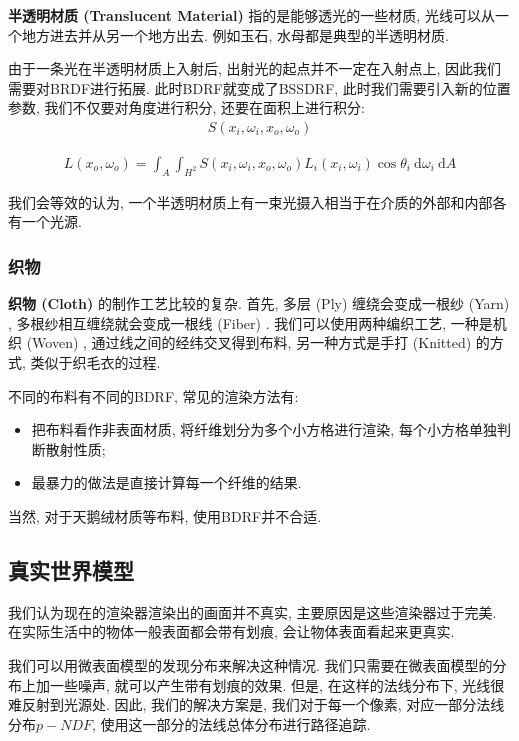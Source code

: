 \documentclass[openany]{progbookcn}
\begin{document}
\textbf{半透明材质 (Translucent Material) }指的是能够透光的一些材质, 光线可以从一个地方进去并从另一个地方出去. 例如玉石, 水母都是典型的半透明材质. 

由于一条光在半透明材质上入射后, 出射光的起点并不一定在入射点上, 因此我们需要对BRDF进行拓展. 此时BDRF就变成了BSSDRF, 此时我们需要引入新的位置参数, 我们不仅要对角度进行积分, 还要在面积上进行积分: 
\begin{eqnarray}
	S(x_i,\omega_i,x_o,\omega_o)
\end{eqnarray}

\begin{eqnarray}
	L\left(x_{o}, \omega_{o}\right)=\int_{A} \int_{H^{2}} S\left(x_{i}, \omega_{i}, x_{o}, \omega_{o}\right) L_{i}\left(x_{i}, \omega_{i}\right) \cos \theta_{i} \mathrm{~d} \omega_{i} \mathrm{~d} A
\end{eqnarray}

我们会等效的认为, 一个半透明材质上有一束光摄入相当于在介质的外部和内部各有一个光源. 

\subsubsection{织物}

\textbf{织物 (Cloth) }的制作工艺比较的复杂. 首先, 多层 (Ply) 缠绕会变成一根纱 (Yarn) , 多根纱相互缠绕就会变成一根线 (Fiber) . 我们可以使用两种编织工艺, 一种是机织 (Woven) , 通过线之间的经纬交叉得到布料, 另一种方式是手打 (Knitted) 的方式, 类似于织毛衣的过程. 

不同的布料有不同的BDRF, 常见的渲染方法有: 
\begin{itemize}
	\item 把布料看作非表面材质, 将纤维划分为多个小方格进行渲染, 每个小方格单独判断散射性质; 
	\item 最暴力的做法是直接计算每一个纤维的结果. 
\end{itemize}

当然, 对于天鹅绒材质等布料, 使用BDRF并不合适. 

\subsection{真实世界模型}

我们认为现在的渲染器渲染出的画面并不真实, 主要原因是这些渲染器过于完美. 在实际生活中的物体一般表面都会带有划痕, 会让物体表面看起来更真实. 

我们可以用微表面模型的发现分布来解决这种情况. 我们只需要在微表面模型的分布上加一些噪声, 就可以产生带有划痕的效果. 但是, 在这样的法线分布下, 光线很难反射到光源处. 因此, 我们的解决方案是, 我们对于每一个像素, 对应一部分法线分布$p-NDF$, 使用这一部分的法线总体分布进行路径追踪. 
\end{document}
